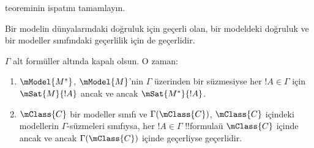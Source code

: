 \begin{prob}
   teoreminin ispatını tamamlayın.
\end{prob}

Bir modelin dünyalarındaki doğruluk için geçerli olan, bir modeldeki
doğruluk ve bir modeller sınıfındaki geçerlilik için de geçerlidir.

\begin{cor}
  $\Gamma$ alt formüller altında kapalı olsun. O zaman:
  \begin{enumerate}
  \item $\mModel{M^*}$, $\mModel{M}$'nin $\Gamma$ üzerinden bir süzmesiyse
    her $!A\in\Gamma$ için $\mSat{M}{!A}$ ancak ve ancak
    $\mSat{M^*}{!A}$.
  \item $\mClass{C}$ bir modeller sınıfı ve $\Gamma(\mClass{C})$,
    $\mClass{C}$ içindeki modellerin $\Gamma$-süzmeleri sınıfıysa, her
    $!A\in\Gamma$ !!{formula}{}ü $\mClass{C}$ içinde ancak ve ancak
    $\Gamma(\mClass{C})$ içinde geçerliyse geçerlidir.
  \end{enumerate}
\end{cor}

